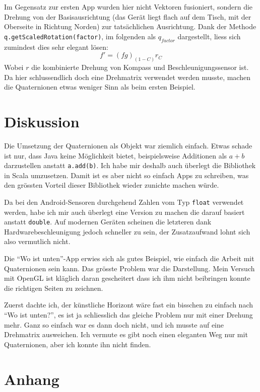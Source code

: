 \documentclass[12pt]{article}
\begin{document}
  Im Gegensatz zur ersten App wurden hier nicht Vektoren fusioniert, sondern die Drehung von der Basisausrichtung (das Gerät liegt flach auf dem Tisch, mit der Oberseite in Richtung Norden) zur tatsächlichen Ausrichtung. Dank der Methode \texttt{q.getScaledRotation(factor)}, im folgenden als $q_{factor}$ dargestellt, liess sich zumindest dies sehr elegant lösen:
  $$ f' = (f g)_{(1-C)} r_{C} $$
  Wobei $r$ die kombinierte Drehung von Kompass und Beschleunigungssensor ist.  Da hier schlussendlich doch eine Drehmatrix verwendet werden musste, machen die Quaternionen etwas weniger Sinn als beim ersten Beispiel.


  \section{Diskussion}

  Die Umsetzung der Quaternionen als Objekt war ziemlich einfach. Etwas schade ist nur, dass Java keine Möglichkeit bietet, beispielsweise Additionen als $a + b$ darzustellen anstatt \texttt{a.add(b)}. Ich habe mir deshalb auch überlegt die Bibliothek in Scala umzusetzen. Damit ist es aber nicht so einfach Apps zu schreiben, was den grössten Vorteil dieser Bibliothek wieder zunichte machen würde.

  Da bei den Android-Sensoren durchgehend Zahlen vom Typ \texttt{float} verwendet werden, habe ich mir auch überlegt eine Version zu machen die darauf basiert anstatt \texttt{double}. Auf modernen Geräten scheinen die letzteren dank Hardwarebeschleunigung jedoch schneller zu sein, der Zusatzaufwand lohnt sich also vermutlich nicht.

  Die ``Wo ist unten''-App erwies sich als gutes Beispiel, wie einfach die Arbeit mit Quaternionen sein kann. Das grösste Problem war die Darstellung. Mein Versuch mit OpenGL ist kläglich daran gescheitert dass ich ihm nicht beibringen konnte die richtigen Seiten zu zeichnen.

  Zuerst dachte ich, der künstliche Horizont wäre fast ein bisschen zu einfach nach ``Wo ist unten?'', es ist ja schliesslich das gleiche Problem nur mit einer Drehung mehr. Ganz so einfach war es dann doch nicht, und ich musste auf eine Drehmatrix ausweichen. Ich vermute es gibt noch einen eleganten Weg nur mit Quaternionen, aber ich konnte ihn nicht finden.


  \appendix
  \section*{Anhang}
  \renewcommand{\thesubsection}{\Alph{subsection}}
\end{document}
